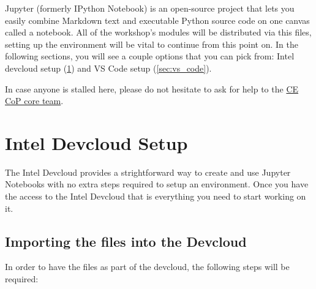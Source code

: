 \documentclass{assignment}
\begin{document}






Jupyter (formerly IPython Notebook) is an open-source project that lets you easily combine Markdown text and executable Python source code on one canvas called a notebook. All of the workshop's modules will be distributed via this files, setting up the environment will be vital to continue from this point on. In the following sections, you will see a couple options that you can pick from: Intel devcloud setup (\ref{sec:dev_cloud}) and VS Code setup (\ref{sec:vs_code}).

In case anyone is stalled here, please do not hesitate to ask for help to the \href{mailto:computer.eng.cop.core.team@intel.com}{CE CoP core team}. 

\section{Intel Devcloud Setup}
\label{sec:dev_cloud}

The Intel Devcloud provides a strightforward way to create and use Jupyter Notebooks with no extra steps required to setup an environment. Once you have the access to the Intel Devcloud that is everything you need to start working on it.

\subsection{Importing the files into the Devcloud}

In order to have the files as part of the devcloud, the following steps will be required:
\end{document}
